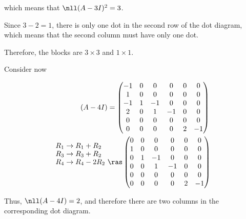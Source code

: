\documentclass[11pt]{scrartcl}
\begin{document}
\begin{soln}
which means that $\nll (A-3I)^2= 3$.

Since $3-2 = 1$, there is only one dot in the second row of the dot diagram, which means that the second column must have only one dot.

Therefore, the blocks are $3\times 3$ and $1\times 1$.

Consider now 

\begin{align}
(A- 4I) &=
  \begin{pmatrix}
    -1  & 0 & 0 & 0 & 0 & 0 \\
    1  & 0 & 0 & 0 & 0 & 0 \\
    -1 & 1 & -1 & 0 & 0 & 0 \\
    2  & 0 & 1 & -1 & 0 & 0 \\
    0  & 0 & 0 & 0 & 0 & 0 \\
    0  & 0 & 0 & 0 & 2 & -1
  \end{pmatrix}\\
  \shortstack[l]{ 
$R_1\to R_1+R_2$\\
$R_3\to R_3+R_2$\\
$R_4\to R_4-2R_2$ }
\ &\ras 
  \begin{pmatrix}
    0  & 0 & 0 & 0 & 0 & 0 \\
    1  & 0 & 0 & 0 & 0 & 0 \\
    0 & 1 & -1 & 0 & 0 & 0 \\
    0  & 0 & 1 & -1 & 0 & 0 \\
    0  & 0 & 0 & 0 & 0 & 0 \\
    0  & 0 & 0 & 0 & 2 & -1
  \end{pmatrix}\\
\end{align}

Thus, $\nll(A-4I) = 2$, and therefore there are two columns in the corresponding dot diagram.


\end{soln}
\end{document}
